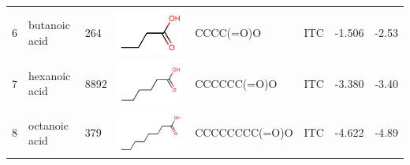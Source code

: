 \documentclass[aps,pre,twocolumn,nofootinbib,superscriptaddress,10pt, final,tightenlines]{revtex4-1}
\begin{document}
\begin{table}
\begin{tabular}{lllp{2cm}>{\ttfamily}llS[table-format=-1.3, table-figures-uncertainty=1]S[table-format=-1.2, table-figures-uncertainty=1]}
6    & butanoic acid            & 264      & \parbox[c]{1em}{\includegraphics[scale=0.2]{figures/264.pdf}}   & CCCC(=O)O       & ITC    & -1.506   & -2.53  \\
7    & hexanoic acid            & 8892     & \parbox[c]{1em}{\includegraphics[scale=0.2]{figures/8892.pdf}}  & CCCCCC(=O)O     & ITC    & -3.380   & -3.40  \\
8    & octanoic acid            & 379      & \parbox[c]{1em}{\includegraphics[scale=0.2]{figures/379.pdf}}   & CCCCCCCC(=O)O   & ITC    & -4.622   & -4.89  \\

\end{tabular}
\end{table}
\end{document}
